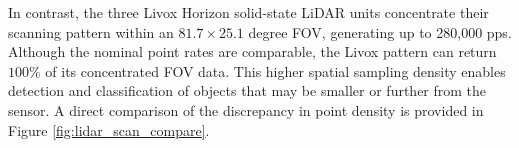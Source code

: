 \documentclass{erauthesis}
\begin{document}

In contrast, the three Livox Horizon solid-state \ac{LiDAR} units concentrate their scanning pattern within an $81.7 \times 25.1$ degree \ac{FOV}, generating up to 280,000 \ac{pps}. 
Although the nominal point rates are comparable, the Livox pattern can return $100 \%$ of its concentrated \ac{FOV} data. 
This higher spatial sampling density enables detection and classification of objects that may be smaller or further from the sensor.
A direct comparison of the discrepancy in point density is provided in Figure \ref{fig:lidar_scan_compare}.

\end{document}
